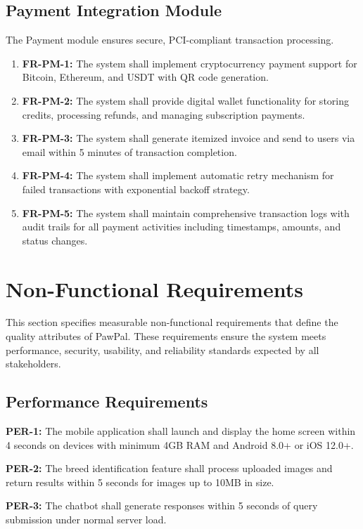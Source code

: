 \subsection{Payment Integration Module}
The Payment module ensures secure, PCI-compliant transaction processing.

\begin{enumerate}

    \item \textbf{FR-PM-1:} The system shall implement cryptocurrency payment support for Bitcoin, Ethereum, and USDT with QR code generation.
    \item \textbf{FR-PM-2:} The system shall provide digital wallet functionality for storing credits, processing refunds, and managing subscription payments.
    \item \textbf{FR-PM-3:} The system shall generate itemized invoice and send to users via email within 5 minutes of transaction completion.
    \item \textbf{FR-PM-4:} The system shall implement automatic retry mechanism for failed transactions with exponential backoff strategy.
    \item \textbf{FR-PM-5:} The system shall maintain comprehensive transaction logs with audit trails for all payment activities including timestamps, amounts, and status changes.
\end{enumerate}

\section{Non-Functional Requirements}
This section specifies measurable non-functional requirements that define the quality attributes of PawPal. These requirements ensure the system meets performance, security, usability, and reliability standards expected by all stakeholders.

\subsection{Performance Requirements}

\textbf{PER-1:} The mobile application shall launch and display the home screen within 4 seconds on devices with minimum 4GB RAM and Android 8.0+ or iOS 12.0+.

\textbf{PER-2:} The breed identification feature shall process uploaded images and return results within 5 seconds for images up to 10MB in size.

\textbf{PER-3:} The chatbot shall generate responses within 5 seconds of query submission under normal server load.

